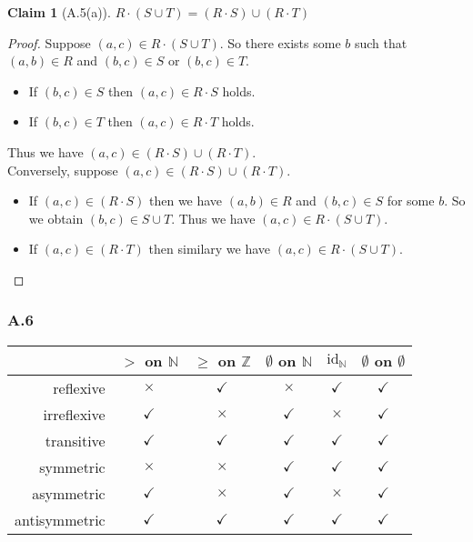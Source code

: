 \documentclass[12pt,aspectratio=169]{beamer}
\theoremstyle{claim}
\newtheorem{claim}[theorem]{Claim}%
\begin{document}
\begin{frame}
    \begin{claim}[A.5(a)]
        $R \cdot (S \cup T) = (R \cdot S) \cup (R \cdot T)$
    \end{claim}

    \begin{proof}
        Suppose $(a,c) \in R \cdot (S \cup T)$.\pause
        So there exists some $b$ such that $(a,b) \in R$ and $(b,c) \in S$ or $(b,c) \in T$.\pause
        \begin{itemize}
            \item If $(b,c) \in S$ then $(a,c) \in R \cdot S$ holds. \pause
            \item If $(b,c) \in T$ then $(a,c) \in R \cdot T$ holds. \pause
        \end{itemize}
        Thus we have $(a,c) \in (R \cdot S) \cup (R \cdot T)$.\\ \pause
        Conversely, suppose $(a,c) \in (R \cdot S) \cup (R \cdot T)$. \pause
        \begin{itemize}
            \item If $(a,c) \in (R \cdot S)$ then we have $(a,b) \in R$ and $(b,c) \in S$ for some $b$. \pause
            So we obtain $(b,c) \in S \cup T$. Thus we have $(a,c) \in R \cdot (S \cup T)$. \pause
            \item If $(a,c) \in (R \cdot T)$ then similary we have $(a,c) \in R \cdot (S \cup T)$.
        \end{itemize}
    \end{proof}
\end{frame}

\newcommand{\yes}{{\color{green}$\checkmark$}}
\newcommand{\no}{{\color{red}$\times$}}

\begin{frame}
    \frametitle{A.6}

    \begin{table}
        \centering
    \begin{tabular}{r|ccccc}
        & $>$ on $\mathbb{N}$ & $\geq$ on $\mathbb{Z}$ & $\emptyset$ on $\mathbb{N}$ & $\mathrm{id}_{\mathbb{N}}$ & $\emptyset$ on $\emptyset$ \\ \hline
        reflexive     & \no  & \yes & \no  & \yes & \yes \\
        irreflexive   & \yes & \no  & \yes & \no  & \yes \\
        transitive    & \yes & \yes & \yes & \yes & \yes \\
        symmetric     & \no  & \no  & \yes & \yes & \yes \\
        asymmetric    & \yes & \no  & \yes & \no  & \yes \\
        antisymmetric & \yes & \yes & \yes & \yes & \yes \\
    \end{tabular}
    \end{table}
\end{frame}
\end{document}
